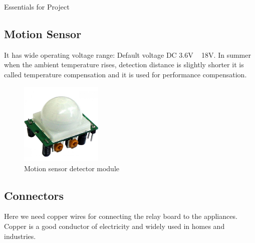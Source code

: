 \documentclass[12pt, oneside]{report}
\numberwithin{equation}{section}
\begin{document}
\begin{chapter}{Essentials for Project}
\subsection{Motion Sensor}
It has wide operating voltage range: Default voltage DC 3.6V ~ 18V. In summer when the ambient temperature rises, detection distance is slightly shorter it is called temperature compensation and it is used for performance compensation.
\begin{figure}[h]
\center
\includegraphics[width=0.35\textwidth]{motion_sensor}
\caption{Motion sensor detector module}
\end{figure}

\subsection{Connectors}
Here we need copper wires for connecting the relay board to the appliances. Copper is a good conductor of electricity and widely used in homes and industries. 

\end{chapter}
\end{document}

